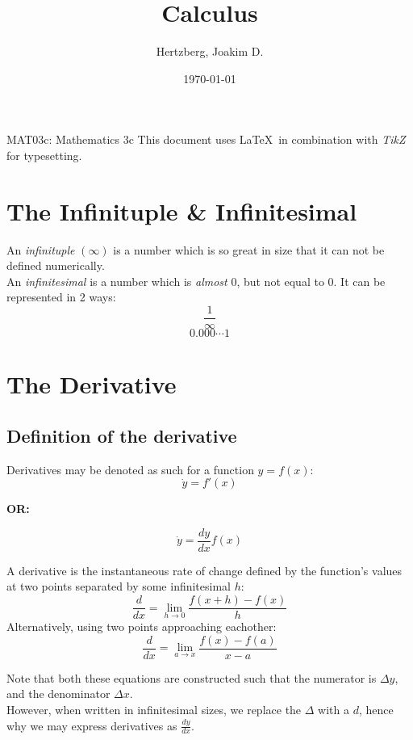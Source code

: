 \documentclass[12pt]{article}
\title{Calculus}
\author{Hertzberg, Joakim D.}
\date{\today}
\begin{document}
\maketitle
\begin{center}
MAT03c: Mathematics 3c
\vfill
This document uses \LaTeX\ in combination with \emph{TikZ} for typesetting.
\end{center}
\thispagestyle{empty}
\newpage
\tableofcontents
\thispagestyle{empty}
\setcounter{page}{0}
\newpage
\section{The Infinituple \& Infinitesimal}
An \emph{infinituple} $(\infty)$ is a number which is so great in size that it can not be defined numerically. \\ 
An \emph{infinitesimal} is a number which is \emph{almost} $0$, but not equal to $0$. It can be represented in 2 ways:
$$\frac{1}{\infty}$$
$$0.000\cdots1$$

\section{The Derivative}
\subsection{Definition of the derivative}

Derivatives may be denoted as such for a function $y = f(x)$:
$$\dot{y} = f'(x)$$
\begin{center}
\textbf{OR:}
\end{center}	
$$\dot{y} = \frac{dy}{dx}f(x)$$


A derivative is the instantaneous rate of change defined by the function's values at two points separated by some infinitesimal $h$:
\begin{equation}
	\frac{d}{dx} = \lim_{h\rightarrow0} \frac{f(x+h) - f(x)}{h}
\end{equation}
Alternatively, using two points approaching eachother:
\begin{equation}
	\frac{d}{dx} = \lim_{a\rightarrow x} \frac{f(x)-f(a)}{x-a}
\end{equation}

Note that both these equations are constructed such that the numerator is $\Delta y$, and the denominator $\Delta x$. \\
However, when written in infinitesimal sizes, we replace the $\Delta$ with a $d$, hence why we may express derivatives as $\frac{dy}{dx}$. 
\end{document}
